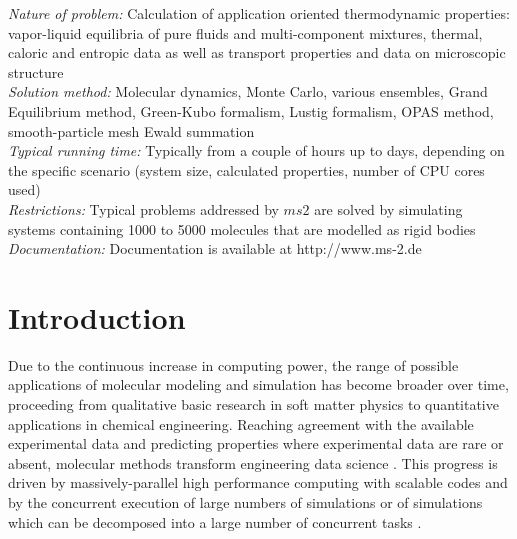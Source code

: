 \documentclass[preprint,12pt]{elsarticle}
\begin{document}
\begin{small}
\noindent
{\em Nature of problem:} Calculation of application oriented thermodynamic properties: vapor-liquid equilibria of pure fluids and multi-component mixtures, thermal, caloric and entropic data as well as transport properties and data on microscopic structure\\

\noindent
{\em Solution method:} Molecular dynamics, Monte Carlo, various ensembles, Grand Equilibrium method, Green-Kubo formalism, Lustig formalism, OPAS method, smooth-particle mesh Ewald summation\\

\noindent
{\em Typical running time:} Typically from a couple of hours up to days, depending on the specific scenario (system size, calculated properties, number of CPU cores used)\\

\noindent
{\em Restrictions:} Typical problems addressed by $ms2$ are solved by simulating systems containing 1000 to 5000 molecules that are modelled as rigid bodies\\

\noindent
{\em Documentation:} Documentation is available at http://www.ms-2.de\\


\end{small}

\newpage

\section{Introduction}
\label{sec:intro}

Due to the continuous increase in computing power, the range of possible applications of molecular modeling and simulation has become broader over time, proceeding from qualitative basic research in soft matter physics to quantitative applications in chemical engineering. Reaching agreement with the available experimental data and predicting properties where experimental data are rare or absent, molecular methods transform engineering data science \cite{ungerer2007molecular,palmer2015recent}. This progress is driven by massively-parallel high performance computing with scalable codes \cite{bungartz2015alexander} and by the concurrent execution of large numbers of simulations \cite{koster2016automatized} or of simulations which can be decomposed into a large number of concurrent tasks \cite{valeriani2007computing,glowacki2011boxed,meadley2012thermodynamics}.
\end{document}
